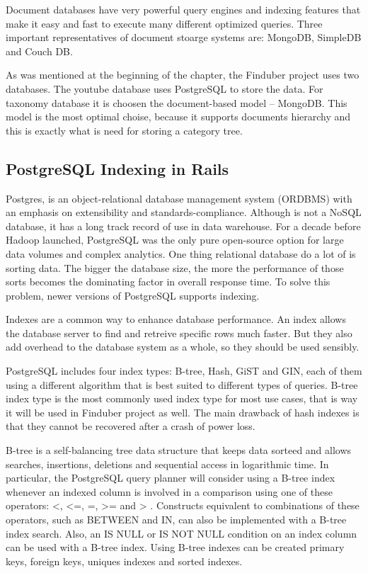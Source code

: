 Document databases have very powerful query engines and indexing features that make it easy and fast to execute many different optimized queries. \cite{mongodb-adv} Three important representatives of document stoarge systems are: MongoDB, SimpleDB and Couch DB. 

As was mentioned at the beginning of the chapter, the Finduber project uses two databases. The youtube database uses PostgreSQL to store the data. For taxonomy database it is choosen the document-based model -- MongoDB. This model is the most optimal choise, because it supports documents hierarchy and this is exactly what is need for storing a category tree.

\subsection{PostgreSQL Indexing in Rails}

Postgres, is an object-relational database management system (ORDBMS) with an emphasis on extensibility and standards-compliance. Although is not a NoSQL database, it has a long track record of use in data warehouse. For a decade before Hadoop launched, PostgreSQL was the only pure open-source option for large data volumes and complex analytics. One thing relational database do a lot of is sorting data. The bigger the database size, the more the performance of those sorts becomes the dominating factor in overall response time.\cite{whypostgres} To solve this problem, newer versions of PostgreSQL supports indexing. 

Indexes are a common way to enhance database performance. An index allows the database server to find and retreive specific rows much faster. But they also add overhead to the database system as a whole, so they should be used sensibly.

PostgreSQL includes four index types: B-tree, Hash, GiST and GIN, each of them using a different algorithm that is best suited to different types of queries. B-tree index type is the most commonly used index type for most use cases, that is way it will be used in Finduber project as well. The main drawback of hash indexes is that they cannot be recovered after a crash of power loss. 

B-tree is a self-balancing tree data structure that keeps data sorteed and allows searches, insertions, deletions and sequential access in logarithmic time. In particular, the PostgreSQL query planner will consider using a B-tree index whenever an indexed column is involved in a comparison using one of these operators: <, <=, =, >= and > . Constructs equivalent to combinations of these operators, such as BETWEEN and IN, can also be implemented with a B-tree index search. Also, an IS NULL or IS NOT NULL condition on an index column can be used with a B-tree index.\cite{postgresweb} Using B-tree indexes can be created primary keys, foreign keys, uniques indexes and sorted indexes. 

